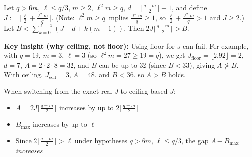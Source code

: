 \begin{lemma}\label{lem:dimension-counting-nat} \leanok {}
  Let $q > 6m$, $\ell \leq q/3$, $m \geq 2$, $\ell^2 m \geq q$, $d = \lceil\frac{q-m}{2}\rceil - 1$, and define $J := \lceil\frac{\ell}{2} + \frac{\ell^2 m}{q}\rceil$. (Note: $\ell^2 m \geq q$ implies $\frac{\ell^2 m}{q} \geq 1$, so $\frac{\ell}{2} + \frac{\ell^2 m}{q} > 1$ and $J \geq 2$.) Let $B < \sum_{k=0}^{\ell-1} (J + d + k(m-1))$. Then $2J\lceil\frac{q-m}{2}\rceil > B$.

  \textbf{Key insight (why ceiling, not floor):} Using floor for $J$ can fail. For example, with $q = 19$, $m = 3$, $\ell = 3$ (so $\ell^2 m = 27 \geq 19 = q$), we get $J_{\text{floor}} = \lfloor 2.92 \rfloor = 2$, $d = 7$, $A = 2 \cdot 2 \cdot 8 = 32$, and $B$ can be up to $32$ (since $B < 33$), giving $A \not> B$. With ceiling, $J_{\text{ceil}} = 3$, $A = 48$, and $B < 36$, so $A > B$ holds.

  When switching from the exact real $J$ to ceiling-based $J$:
  \begin{itemize}
    \item $A = 2J\lceil\frac{q-m}{2}\rceil$ increases by up to $2\lceil\frac{q-m}{2}\rceil$
    \item $B_{\max}$ increases by up to $\ell$
    \item Since $2\lceil\frac{q-m}{2}\rceil > \ell$ under hypotheses $q > 6m$, $\ell \leq q/3$, the gap $A - B_{\max}$ \emph{increases}
  \end{itemize}
\end{lemma}
